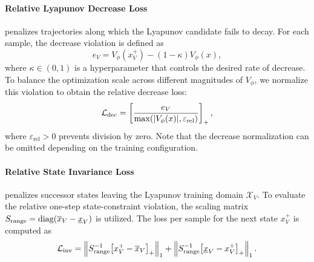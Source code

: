 \paragraph{Relative Lyapunov Decrease Loss} penalizes trajectories along which the Lyapunov candidate fails to decay. 
For each sample, the decrease violation is defined as
\begin{equation}
    \label{eq:lyapunov-decrease}
    e_V =  V_\phi(x^+_V) - (1 - \kappa) V_\phi(x),
\end{equation}
where $\kappa \in (0, 1)$ is a hyperparameter that controls the desired rate of decrease. 
To balance the optimization scale across different magnitudes of $V_\phi$, 
we normalize this violation to obtain the relative decrease loss:
\begin{equation}
    \label{eq:rel-lyapunov-decrease}
    \mathcal{L}_{\mathrm{dec}} = \left[
        \frac{e_V}{\max(|V_\phi(x)|, \varepsilon_{\mathrm{rel}})}
    \right]_+,
\end{equation}
where $\varepsilon_{\mathrm{rel}} > 0$ prevents division by zero. 
Note that the decrease normalization can be omitted depending on the training configuration.


\paragraph{Relative State Invariance Loss} penalizes successor states
leaving the Lyapunov training domain $\mathcal{X}_V $. 
To evaluate the relative one-step state-constraint violation, the scaling matrix 
$S_{\mathrm{range}} = \operatorname{diag}(\overline{x}_V - \underline{x}_V)$ is utilized.
The loss per sample for the next state $x^+_V$ is computed as
\begin{equation}
    \label{eq:rel-invariance}
    \mathcal{L}_{\mathrm{inv}} = \left\| 
        S_{\mathrm{range}}^{-1} \big[ x^+_V - \overline{x}_V \big]_+ 
    \right\|_1 + \left\| 
        S_{\mathrm{range}}^{-1} \big[ \underline{x}_V - x^+_V \big]_+ 
    \right\|_1.
\end{equation}


